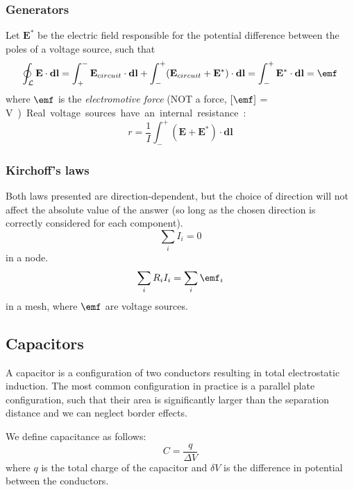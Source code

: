 \documentclass[a4paper, 12pt]{article}
\renewcommand{\vec}[1]{\mathbf{#1}}
\newcommand{\E}{\ensuremath{\vec{E}}}
\newcommand{\Epsilon}{\emf}
\begin{document}
    \subsubsection{Generators}
        Let $\E^*$ be the electric field responsible for the potential difference between the poles of a voltage source, such that
        \begin{equation}
            \oint_\mathcal{L} \E\cdot \vec{dl} = \int_+^-\E_{circuit}\cdot \vec{dl} + \int_-^+(\E_{circuit} + \E^*)\cdot \vec{dl} = \int_-^+\E^*\cdot \vec{dl} = \Epsilon
        \end{equation}
        where $\Epsilon$ is the \textit{electromotive force} (NOT a force, $\left[\Epsilon\right]$ = \si\volt)
        
        Real voltage sources have an internal resistance:
        \begin{equation}
            r = \frac{1}{I}\int_-^+(\E + \E^*)\cdot\vec{dl}
        \end{equation}
        
    \subsubsection{Kirchoff's laws}
        Both laws presented are direction-dependent, but the choice of direction will not affect the absolute value of the answer (so long as the chosen direction is correctly considered for each component). 
        \begin{equation}
            \sum_i I_i = 0
        \end{equation}
        in a node.
        \begin{equation}
            \sum_i R_iI_i = \sum_i \Epsilon_i
        \end{equation}
        in a mesh, where $\Epsilon$ are voltage sources. 

    \subsection{Capacitors}
    A capacitor is a configuration of two conductors resulting in total electrostatic induction. The most common configuration in practice is a parallel plate configuration, such that their area is significantly larger than the separation distance and we can neglect border effects.
    
    We define capacitance as follows:
    \begin{equation}
        C = \frac{q}{\Delta V}
    \end{equation}
    where $q$ is the total charge of the capacitor and $\delta V$ is the difference in potential between the conductors.
    
\end{document}
